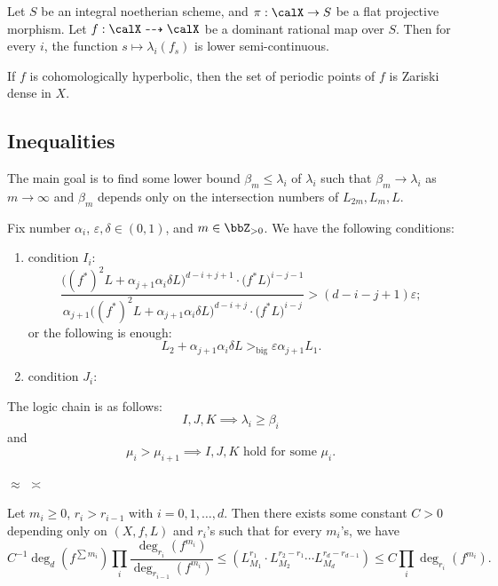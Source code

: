   \begin{mainthm}\label{mainthm:semi-continuity}
    Let $S$ be an integral noetherian scheme, and $\pi: \calX \to S$ be a flat projective morphism. 
    Let $f: \calX \dashrightarrow \calX$ be a dominant rational map over $S$.
    Then for every $i$, the function $s \mapsto \lambda_i(f_s)$ is lower semi-continuous.
  \end{mainthm}

  \begin{mainthm}
    If $f$ is cohomologically hyperbolic, then the set of periodic points of $f$ is Zariski dense in $X$.
  \end{mainthm}


\subsection{Inequalities}


  The main goal is to find some lower bound $\beta_m \leq \lambda_i$ of $\lambda_i$ such that $\beta_m \to \lambda_i$ as $m \to \infty$ and $\beta_m$ depends only on the intersection numbers of $L_{2m}, L_m, L$.


  Fix number $\alpha_i$, $\varepsilon, \delta \in (0, 1)$, and $m \in \bbZ_{>0}$. 
  We have the following conditions:
  \begin{enumerate}
    \item condition $I_i$:
      \[ \frac{\bigl((f^*)^2L+\alpha_{j+1}\alpha_{i}\delta L\bigr)^{d-i+j+1} \cdot \bigl(f^*L\bigr)^{i-j-1}}{\alpha_{j+1}\bigl((f^*)^2L+\alpha_{j+1}\alpha_{i}\delta L\bigr)^{d-i+j} \cdot \bigl(f^*L\bigr)^{i-j}} > (d-i-j+1) \varepsilon; \]
      or the following is enough:
      \[ L_2 + \alpha_{j+1}\alpha_{i}\delta L >_{\text{big}} \varepsilon \alpha_{j+1} L_1. \]
    \item condition $J_i$:
  \end{enumerate}


  The logic chain is as follows:
  \[ I,J,K \implies \lambda_i \geq \beta_i \]
  and 
  \[ \mu_i > \mu_{i+1} \implies I,J,K \text{ hold for some } \mu_i. \]

  $\approx$ $\asymp$


  \begin{proposition}
    \Yang{}
    Let $m_i \geq 0$, $r_i > r_{i-1}$ with $i = 0, 1, \ldots, d$.
    Then there exists some constant $C > 0$ depending only on $(X,f,L)$ and $r_i$'s such that for every $m_i$'s, we have
    \[ C^{-1} \deg_d(f^{\sum m_i}) \prod_i \frac{\deg_{r_i}(f^{m_i})}{\deg_{r_{i-1}}(f^{m_i})} \leq (L_{M_1}^{r_1} \cdot L_{M_2}^{r_2 - r_1} \cdots L_{M_d}^{r_d - r_{d-1}}) \leq C \prod_i \deg_{r_i}(f^{m_i}). \]
  \end{proposition}

